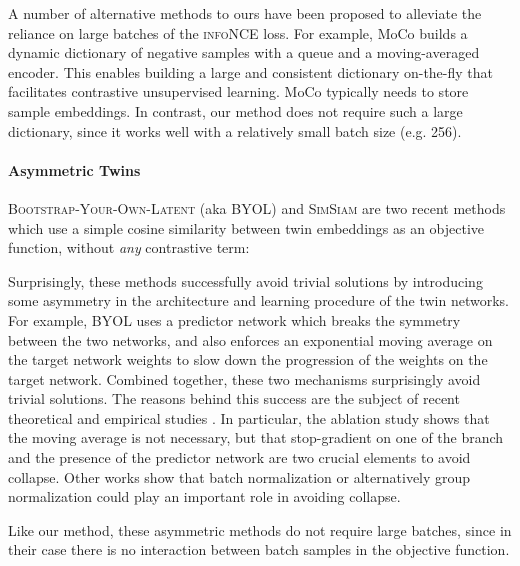 \documentclass{article}
\begin{document}
A number of alternative methods to ours have been proposed to alleviate the reliance on large batches of the \textsc{infoNCE} loss. For example, MoCo \cite{he2019momentum, chen2020improved} builds a dynamic dictionary of negative samples with a queue and a moving-averaged encoder. This enables building a large and consistent dictionary on-the-fly that facilitates contrastive unsupervised learning. MoCo typically needs to store  sample embeddings. In contrast, our method does not require such a large dictionary, since it works well with a relatively small batch size (e.g. 256).



\paragraph{Asymmetric Twins}

\textsc{Bootstrap-Your-Own-Latent} (aka \textsc{BYOL}) \cite{grill2020bootstrap} and \textsc{SimSiam} \cite{chen2020exploring} are two recent methods which use a simple cosine similarity between twin embeddings as an objective function, without \emph{any} contrastive term:



Surprisingly, these methods successfully avoid trivial solutions by introducing some asymmetry in the architecture and learning procedure of the twin networks. For example, \textsc{BYOL} uses a predictor network which breaks the symmetry between the two networks, and also enforces an exponential moving average on the target network weights to slow down the progression of the weights on the target network. Combined together, these two mechanisms surprisingly avoid trivial solutions. The reasons behind this success are the subject of recent theoretical and empirical studies \cite{tian_understanding_2020,chen2020exploring,fetterman_understanding_2020,richemond_byol_2020}. In particular, the ablation study \cite{chen2020exploring} shows that the moving average is not necessary, but that stop-gradient on one of the branch and the presence of the predictor network are two crucial elements to avoid collapse. Other works show that batch normalization \cite{tian_understanding_2020,fetterman_understanding_2020} or alternatively group normalization \cite{richemond_byol_2020} could play an important role in avoiding collapse.

Like our method, these asymmetric methods do not require large batches, since in their case there is no interaction between batch samples in the objective function.
\end{document}
